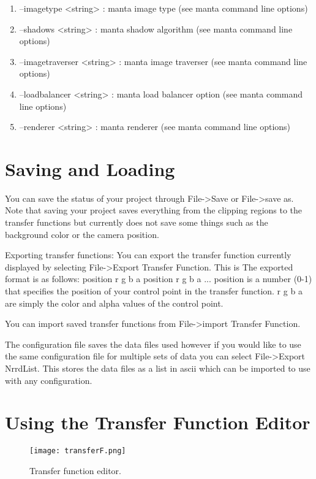 \begin{enumerate}

\item
--imagetype <string> : manta image type (see manta command line options)
\item
--shadows <string> : manta shadow algorithm (see manta command line options)
\item
--imagetraverser <string> : manta image traverser (see manta command line options)
\item
--loadbalancer <string> : manta load balancer option (see manta command line options)
\item
--renderer <string> : manta renderer (see manta command line options)


\end{enumerate}

\section{Saving and Loading}

You can save the status of your project through File->Save or File->save as. Note that saving your project saves everything from the clipping regions to the transfer functions but currently does not save some things such as the background color or the camera position.

Exporting transfer functions: You can export the transfer function currently displayed by selecting File->Export Transfer Function. This is The exported format is as follows: position r g b a position r g b a ... position is a number (0-1) that specifies the position of your control point in the transfer function. r g b a are simply the color and alpha values of the control point.

You can import saved transfer functions from File->import Transfer Function. 

The configuration file saves the data files used however if you would like to use the same configuration file for multiple sets of data you can select File->Export NrrdList.  This stores the data files as a list in ascii which can be imported to use with any configuration.  

\section{Using the Transfer Function Editor}

\begin{figure}[htbp]
  \center
  \texttt{[image: transferF.png]}
  \caption{Transfer function editor.}
  \label{fig:manta_tf}
\end{figure}


